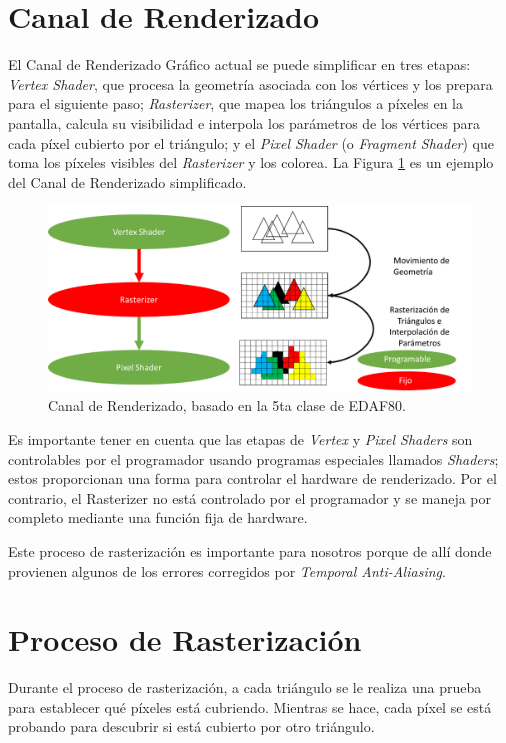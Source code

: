 \documentclass[pregrado]{tesis-usb} %
\begin{document}
\section{Canal de Renderizado}
El Canal de Renderizado Gráfico actual se puede simplificar en tres etapas: \textit{Vertex Shader}, que procesa la geometría asociada con los vértices y los prepara para el siguiente paso; \textit{Rasterizer}, que mapea los triángulos a píxeles en la pantalla, calcula su visibilidad e interpola los parámetros de los vértices para cada píxel cubierto por el triángulo; y el \textit{Pixel Shader} (o \textit{Fragment Shader}) que toma los píxeles visibles del \textit{Rasterizer} y los colorea. La Figura \ref{fig:graphpipeline} es un ejemplo del Canal de Renderizado simplificado.

\begin{figure}[!hbt]
	\centering
	\includegraphics[scale=0.7]{images/graphics_pipeline.png} 
	\caption{Canal de Renderizado, basado en la 5ta clase de EDAF80.~\cite{Doggett2017EDAF80}}\label{fig:graphpipeline}
\end{figure}

Es importante tener en cuenta que las etapas de \textit{Vertex} y \textit{Pixel Shaders} son controlables por el programador usando programas especiales llamados \textit{Shaders}; estos proporcionan una forma para controlar el hardware de renderizado. Por el contrario, el Rasterizer no está controlado por el programador y se maneja por completo mediante una función fija de hardware. \cite{Doggett2017EDAF80}

Este proceso de rasterización es importante para nosotros porque de allí donde provienen algunos de los errores corregidos por \textit{Temporal Anti-Aliasing}.


\section{Proceso de Rasterización}
Durante el proceso de rasterización, a cada triángulo se le realiza una prueba para establecer qué píxeles está cubriendo. Mientras se hace, cada píxel se está probando para descubrir si está cubierto por otro triángulo.
\end{document}
